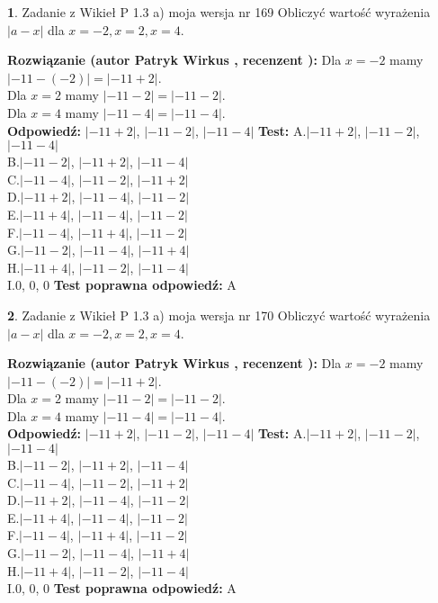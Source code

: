 \documentclass[12pt, a4paper]{article}
\theoremstyle{definition} %
\newtheorem{zad}{}
\newcommand{\zadStart}[1]{\begin{zad}#1\newline}
\newcommand{\zadStop}{\end{zad}}
\newcommand{\rozwStart}[2]{\noindent \textbf{Rozwiązanie (autor #1 , recenzent #2): }\newline}
\newcommand{\rozwStop}{\newline}
\newcommand{\odpStart}{\noindent \textbf{Odpowiedź:}\newline}
\newcommand{\odpStop}{\newline}
\newcommand{\testStart}{\noindent \textbf{Test:}\newline}
\newcommand{\testStop}{\newline}
\newcommand{\kluczStart}{\noindent \textbf{Test poprawna odpowiedź:}\newline}
\newcommand{\kluczStop}{\newline}
\begin{document}
\zadStart{Zadanie z Wikieł P 1.3 a) moja wersja nr 169}
Obliczyć wartość wyrażenia $|a - x|$ dla $x=-2,x=2,x=4$.
\zadStop
\rozwStart{Patryk Wirkus}{}
Dla $x = -2$ mamy $|-11 - (-2)| = |-11 + 2|$.\\
Dla $x = 2$ mamy $|-11 - 2| = |-11 - 2|$.\\
Dla $x = 4$ mamy $|-11 - 4| = |-11 - 4|$.\\
\rozwStop
\odpStart
$|-11 + 2|$, $|-11 - 2|$, $|-11 - 4|$
\odpStop
\testStart
A.$|-11 + 2|$, $|-11 - 2|$, $|-11 - 4|$\\
B.$|-11 - 2|$, $|-11 + 2|$, $|-11 - 4|$\\
C.$|-11 - 4|$, $|-11 - 2|$, $|-11 + 2|$\\
D.$|-11 + 2|$, $|-11 - 4|$, $|-11 - 2|$\\
E.$|-11 + 4|$, $|-11 - 4|$, $|-11 - 2|$\\
F.$|-11 - 4|$, $|-11 + 4|$, $|-11 - 2|$\\
G.$|-11 - 2|$, $|-11 - 4|$, $|-11 + 4|$\\
H.$|-11 + 4|$, $|-11 - 2|$, $|-11 - 4|$\\
I.$0$, $0$, $0$
\testStop
\kluczStart
A
\kluczStop



\zadStart{Zadanie z Wikieł P 1.3 a) moja wersja nr 170}
Obliczyć wartość wyrażenia $|a - x|$ dla $x=-2,x=2,x=4$.
\zadStop
\rozwStart{Patryk Wirkus}{}
Dla $x = -2$ mamy $|-11 - (-2)| = |-11 + 2|$.\\
Dla $x = 2$ mamy $|-11 - 2| = |-11 - 2|$.\\
Dla $x = 4$ mamy $|-11 - 4| = |-11 - 4|$.\\
\rozwStop
\odpStart
$|-11 + 2|$, $|-11 - 2|$, $|-11 - 4|$
\odpStop
\testStart
A.$|-11 + 2|$, $|-11 - 2|$, $|-11 - 4|$\\
B.$|-11 - 2|$, $|-11 + 2|$, $|-11 - 4|$\\
C.$|-11 - 4|$, $|-11 - 2|$, $|-11 + 2|$\\
D.$|-11 + 2|$, $|-11 - 4|$, $|-11 - 2|$\\
E.$|-11 + 4|$, $|-11 - 4|$, $|-11 - 2|$\\
F.$|-11 - 4|$, $|-11 + 4|$, $|-11 - 2|$\\
G.$|-11 - 2|$, $|-11 - 4|$, $|-11 + 4|$\\
H.$|-11 + 4|$, $|-11 - 2|$, $|-11 - 4|$\\
I.$0$, $0$, $0$
\testStop
\kluczStart
A
\kluczStop
\end{document}
